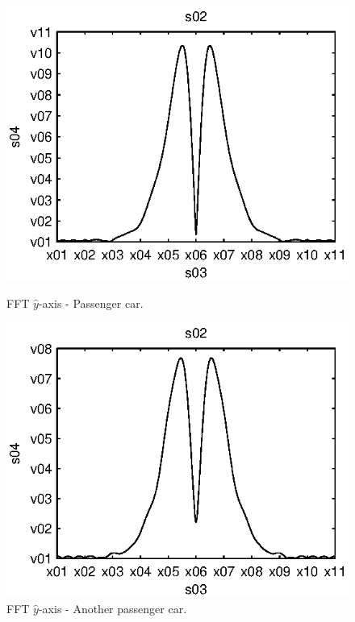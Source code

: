 
\begin{subfigures}
\begin{figure}[thb]
 \centering
 \begin{minipage}{0.45\linewidth}
 	\centering
 	
	\includegraphics[width=1\linewidth]{images/fft-car-y}
  	\caption[FFT $\hat{y}$-axis - Passenger car]{FFT $\hat{y}$-axis - Passenger car.\\}
  	\label{fig:fft-car-y}
 \end{minipage} \hfill
 \begin{minipage}{0.45\linewidth}
 	\centering
  	
	\includegraphics[width=1\linewidth]{images/fft-car3-y}
  	\caption[FFT $\hat{y}$-axis - Another passenger car]{FFT $\hat{y}$-axis - Another passenger car.}
  	\label{fig:fft-car3-y}
 \end{minipage}


\end{figure}
\end{subfigures}
